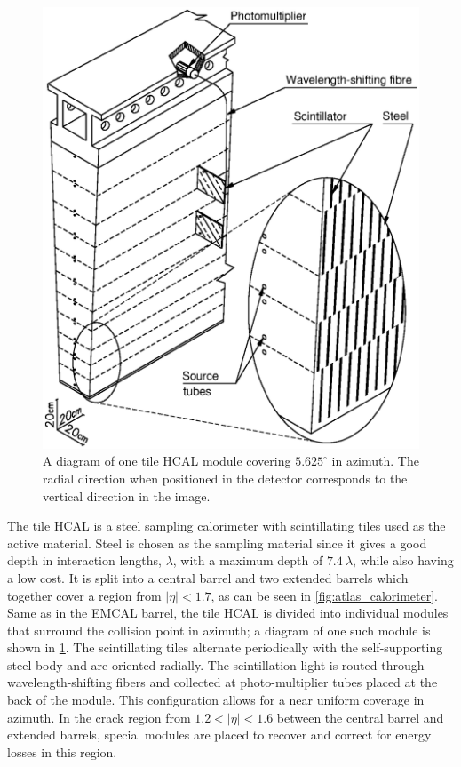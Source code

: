 \begin{figure}[ht]
\centering
\includegraphics[width=.6\textwidth]{figures/atlas/hcal_module.eps}
\caption{ A diagram of one tile HCAL module 
covering $5.625^{\circ}$ in azimuth. The radial direction when 
positioned in the detector corresponds to the vertical direction in the
image.}
\label{fig:atlas_hcal_module}
\end{figure}


The tile HCAL is a steel sampling calorimeter with scintillating tiles used as the 
active material.
Steel is chosen as the sampling material since it gives a good
depth in interaction lengths, $\lambda$, with a maximum depth
of $7.4~\lambda$, while also having a low cost.
It is split into a central barrel and two extended barrels 
which together cover a 
region from $|\eta|< 1.7$, as can be seen in \fig\ref{fig:atlas_calorimeter}.
Same as in the EMCAL barrel, the tile HCAL is divided into individual modules
that surround the collision point in azimuth; a diagram of one such
module is shown in \fig\ref{fig:atlas_hcal_module}.
The scintillating tiles alternate periodically with the self-supporting
steel body and are oriented radially. 
The scintillation
light is routed through wavelength-shifting fibers and collected
at photo-multiplier tubes placed at the back of the module.
This configuration allows for a near uniform coverage in azimuth.  
In the crack region from $1.2 < |\eta| < 1.6$ between the central barrel 
and extended barrels, special modules are placed to recover and correct
for energy losses in this region.

